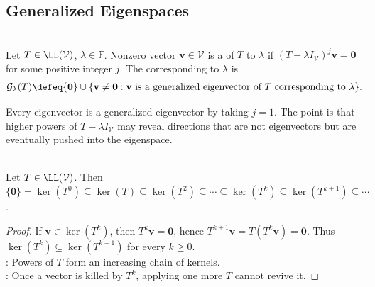 \subsection{Generalized Eigenspaces}

\begin{definition} \label{def:generalized-eigenvector-and-eigenspace} \\
Let $T\in\LL(\mathcal{V})$, $\lambda\in\mathbb{F}$. Nonzero vector $\mathbf{v}\in\mathcal{V}$ is a  of $T$ to $\lambda$ if $(T-\lambda I_{\mathcal{V}})^j\mathbf{v}=\mathbf{0}$ for some positive integer $j$. The  corresponding to $\lambda$ is
\begin{align}
\mathcal{G}_{\lambda}(T)\defeq \{\mathbf{0}\}\cup\{\mathbf{v}\neq\mathbf{0}:\mathbf{v}\text{ is a generalized eigenvector of }T\text{ corresponding to }\lambda\}.
\nonumber
\end{align}
\end{definition}

Every eigenvector is a generalized eigenvector by taking $j=1$. The point is that higher powers of $T-\lambda I_{\mathcal{V}}$ may reveal directions that are not eigenvectors but are eventually pushed into the eigenspace.

\begin{proposition} \label{prop:kernels-of-powers-increase} \\
Let $T\in\LL(\mathcal{V})$. Then $\{\mathbf{0}\}=\ker(T^0)\subseteq\ker(T)\subseteq\ker(T^2)\subseteq\cdots\subseteq\ker(T^k)\subseteq\ker(T^{k+1})\subseteq\cdots$.
\begin{proof}
If $\mathbf{v}\in\ker(T^k)$, then $T^k\mathbf{v}=\mathbf{0}$, hence $T^{k+1}\mathbf{v}=T(T^k\mathbf{v})=\mathbf{0}$. Thus $\ker(T^k)\subseteq\ker(T^{k+1})$ for every $k\geq0$.\\
: Powers of $T$ form an increasing chain of kernels.\\
: Once a vector is killed by $T^k$, applying one more $T$ cannot revive it.
\end{proof}
\end{proposition}


